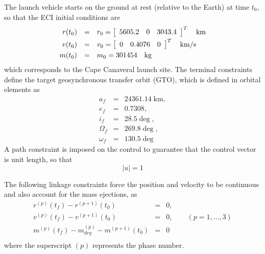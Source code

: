 \documentclass[10pt]{article}
\begin{document}
	The launch vehicle starts on the ground at rest (relative to the Earth) at time $t_0$, so that the ECI initial conditions are
	\begin{equation}\label{ICs}
	\begin{array}{rcl}
	{ r}(t_0) &=& { r}_0 = \left[ \begin{array}{ccc} 5605.2 & 0 & 3043.4 \end{array} \right] ^T\quad \mbox{km} \vspace{3pt}\\
	{ v}(t_0) &=& { v}_0 = \left[ \begin{array}{ccc} 0 & 0.4076 & 0 \end{array} \right]^T \quad \mbox{km/s} \vspace{3pt}\\
	m(t_0) &=& m_0 = 301454 \quad \mbox{kg}
	\end{array}
	\end{equation}
	which corresponds to the Cape Canaveral launch site.  The terminal constraints
	define the target geosynchronous transfer orbit (GTO), which is defined in
	orbital elements as
	\begin{equation}\label{FCs}
	\begin{array}{rcl}
	a_f &=   &  24361.14 \; \mbox{km}, \\
	e_f &=   &  0.7308, \\
	i_f &=   &  28.5\deg,\\
	\Omega_f &= & 269.8\deg, \\
	\omega_f &= & 130.5\deg
	\end{array}
	\end{equation}
    A path constraint is imposed on the control to guarantee
	that the control vector is unit length, so that
	\begin{equation}\label{upath}
	|{ u}| = 1
	\end{equation}
	
  The following linkage constraints force the position and velocity to be continuous and also account for the mass ejections, as
	\begin{equation}
	\begin{array}{rcl}
	{ r}^{(p)}(t_f)-{ r}^{(p+1)}(t_0) &=& { 0}, \\
	{ v}^{(p)}(t_f)-{ v}^{(p+1)}(t_0) &=& { 0}, \qquad (p=1,\ldots,3)\\
	m^{(p)}(t_f)-m_{dry}^{(p)}-m^{(p+1)}(t_0) &=& 0 \\
	\end{array}
	\end{equation}
	where the superscript $(p)$ represents the phase number.\\
	
\end{document}
